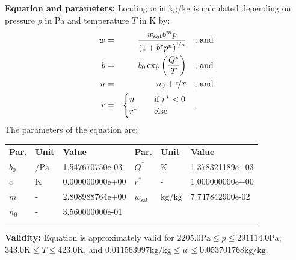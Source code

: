 \textbf{Equation and parameters:}
\newline
%
Loading $w$ in $\si{\kilogram\per\kilogram}$ is calculated depending on pressure $p$ in $\si{\pascal}$ and temperature $T$ in $\si{\kelvin}$ by:
%
\begin{equation*}
\begin{split}
w &=& \frac{w_\mathrm{sat} b^{m} p}{\left( 1 + b^{r} p^{n} \right)^{\nicefrac{1}{n}}} & \quad\text{, and} \\
b &=& b_0 \exp\left( \frac{Q^{*}}{T} \right) & \quad\text{, and} \\
n &=& n_0 + \nicefrac{c}{T} & \quad\text{, and} \\
r &=& \begin{cases} n & \quad \text{if } r^{*} < 0 \\ r^{*}  & \quad \text{else} \end{cases} & \quad\text{.}
\end{split}
\end{equation*}
%
The parameters of the equation are:
%
\begin{longtable}[l]{lll|lll}
\toprule
\addlinespace
\textbf{Par.} & \textbf{Unit} & \textbf{Value} &	\textbf{Par.} & \textbf{Unit} & \textbf{Value} \\
\addlinespace
\midrule
\endhead

\bottomrule
\endfoot
\bottomrule
\endlastfoot
\addlinespace

$b_0$ & $\si{\per\pascal}$ & 1.547670750e-03 & $Q^{*}$ & $\si{\kelvin}$ & 1.378321189e+03 \\
$c$ & $\si{\kelvin}$ & 0.000000000e+00 & $r^{*}$ & - & 1.000000000e+00 \\
$m$ & - & 2.808988764e+00 & $w_\mathrm{sat}$ & $\si{\kilogram\per\kilogram}$ & 7.747842900e-02 \\
$n_0$ & - & 3.560000000e-01 & & & \\

\addlinespace\end{longtable}

\textbf{Validity:}
\newline
Equation is approximately valid for $2205.0 \si{\pascal} \leq p \leq 291114.0 \si{\pascal}$,  $343.0 \si{\kelvin} \leq T \leq 423.0 \si{\kelvin}$, and $0.011563997 \si{\kilogram\per\kilogram} \leq w \leq 0.053701768 \si{\kilogram\per\kilogram}$.
\newline

